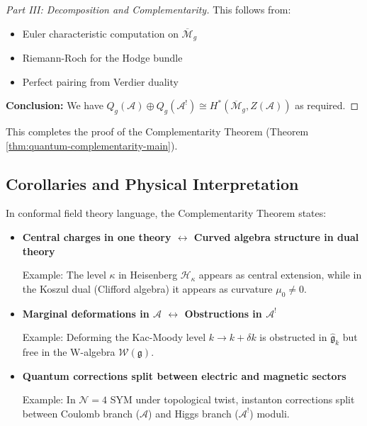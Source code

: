 \begin{proof}[Part III: Decomposition and Complementarity]
This follows from:
\begin{itemize}
\item Euler characteristic computation on $\overline{\mathcal{M}}_g$
\item Riemann-Roch for the Hodge bundle
\item Perfect pairing from Verdier duality
\end{itemize}

\textbf{Conclusion:} We have $Q_g(\mathcal{A}) \oplus Q_g(\mathcal{A}^!) \cong H^*(\overline{\mathcal{M}}_g, Z(\mathcal{A}))$ as required.
\end{proof}

This completes the proof of the Complementarity Theorem (Theorem \ref{thm:quantum-complementarity-main}).

\subsection{Corollaries and Physical Interpretation}

\begin{corollary}
\label{cor:physical-complementarity}
In conformal field theory language, the Complementarity Theorem states:
\begin{itemize}
\item \textbf{Central charges in one theory $\leftrightarrow$ Curved algebra structure 
in dual theory}
   
   Example: The level $\kappa$ in Heisenberg $\mathcal{H}_\kappa$ appears as central 
extension, while in the Koszul dual (Clifford algebra) it appears as curvature $\mu_0 
\neq 0$.

\item \textbf{Marginal deformations in $\mathcal{A}$ $\leftrightarrow$ Obstructions 
in $\mathcal{A}^!$}
   
   Example: Deforming the Kac-Moody level $k \to k + \delta k$ is obstructed in 
$\widehat{\mathfrak{g}}_k$ but free in the W-algebra $\mathcal{W}(\mathfrak{g})$.

\item \textbf{Quantum corrections split between electric and magnetic sectors}
   
   Example: In $\mathcal{N}=4$ SYM under topological twist, instanton corrections 
split between Coulomb branch ($\mathcal{A}$) and Higgs branch ($\mathcal{A}^!$) 
moduli.
\end{itemize}
\end{corollary}

